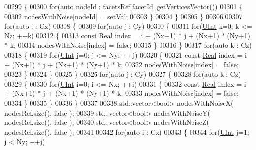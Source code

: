 \begin{DoxyCode}
00299             \{
00300                 \textcolor{keywordflow}{for}(\textcolor{keyword}{auto} nodeId : facetsRef[facetId].getVerticesVector())
00301                 \{
00302                     nodesWithNoise[nodeId] = setVal;
00303                 \}
00304             \}
00305         \}
00306 
00307         \textcolor{keywordflow}{for}(\textcolor{keyword}{auto} i : Cx)
00308         \{
00309             \textcolor{keywordflow}{for}(\textcolor{keyword}{auto} j : Cy)
00310             \{
00311                 \textcolor{keywordflow}{for}(\hyperlink{namespaceFVCode3D_a4bf7e328c75d0fd504050d040ebe9eda}{UInt} k=0; k <= Nz; ++k)
00312                 \{
00313                     \textcolor{keyword}{const} \hyperlink{namespaceFVCode3D_a40c1f5588a248569d80aa5f867080e83}{Real} index = i + (Nx+1) * j + (Nx+1) * (Ny+1) * k;
00314                     nodesWithNoise[index] = \textcolor{keyword}{false};
00315                 \}
00316             \}
00317             \textcolor{keywordflow}{for}(\textcolor{keyword}{auto} k : Cz)
00318             \{
00319                 \textcolor{keywordflow}{for}(\hyperlink{namespaceFVCode3D_a4bf7e328c75d0fd504050d040ebe9eda}{UInt} j=0; j <= Ny; ++j)
00320                 \{
00321                     \textcolor{keyword}{const} \hyperlink{namespaceFVCode3D_a40c1f5588a248569d80aa5f867080e83}{Real} index = i + (Nx+1) * j + (Nx+1) * (Ny+1) * k;
00322                     nodesWithNoise[index] = \textcolor{keyword}{false};
00323                 \}
00324             \}
00325         \}
00326         \textcolor{keywordflow}{for}(\textcolor{keyword}{auto} j : Cy)
00327         \{
00328             \textcolor{keywordflow}{for}(\textcolor{keyword}{auto} k : Cz)
00329             \{
00330                 \textcolor{keywordflow}{for}(\hyperlink{namespaceFVCode3D_a4bf7e328c75d0fd504050d040ebe9eda}{UInt} i=0; i <= Nx; ++i)
00331                 \{
00332                     \textcolor{keyword}{const} \hyperlink{namespaceFVCode3D_a40c1f5588a248569d80aa5f867080e83}{Real} index = i + (Nx+1) * j + (Nx+1) * (Ny+1) * k;
00333                     nodesWithNoise[index] = \textcolor{keyword}{false};
00334                 \}
00335             \}
00336         \}
00337 
00338         std::vector<bool> nodesWithNoiseX( nodesRef.size(), false );
00339         std::vector<bool> nodesWithNoiseY( nodesRef.size(), false );
00340         std::vector<bool> nodesWithNoiseZ( nodesRef.size(), false );
00341 
00342         \textcolor{keywordflow}{for}(\textcolor{keyword}{auto} i : Cx)
00343         \{
00344             \textcolor{keywordflow}{for}(\hyperlink{namespaceFVCode3D_a4bf7e328c75d0fd504050d040ebe9eda}{UInt} j=1; j < Ny; ++j)

\end{DoxyCode}
